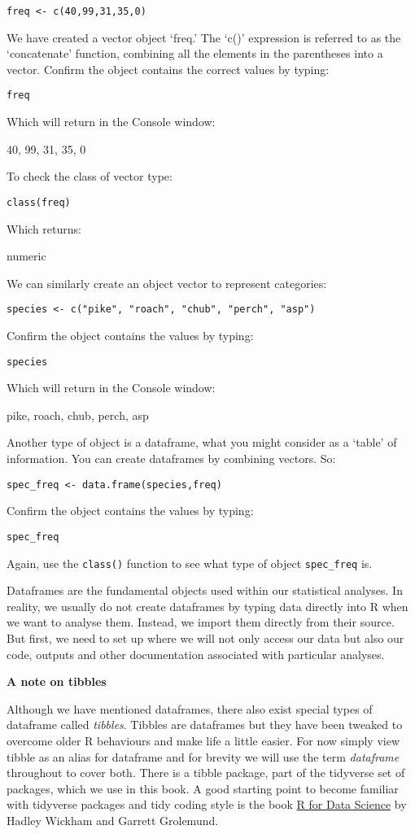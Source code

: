 \documentclass[
]{book}
\begin{document}
\texttt{freq\ \textless{}-\ c(40,99,31,35,0)}

We have created a vector object `freq.' The `c()' expression is referred
to as the `concatenate' function, combining all the elements in the
parentheses into a vector. Confirm the object contains the correct
values by typing:

\texttt{freq}

Which will return in the Console window:

40, 99, 31, 35, 0

To check the class of vector type:

\texttt{class(freq)}

Which returns:

numeric

We can similarly create an object vector to represent categories:

\texttt{species\ \textless{}-\ c("pike",\ "roach",\ "chub",\ "perch",\ "asp")}

Confirm the object contains the values by typing:

\texttt{species}

Which will return in the Console window:

pike, roach, chub, perch, asp

Another type of object is a dataframe, what you might consider as a
`table' of information. You can create dataframes by combining vectors.
So:

\texttt{spec\_freq\ \textless{}-\ data.frame(species,freq)}

Confirm the object contains the values by typing:

\texttt{spec\_freq}

Again, use the \texttt{class()} function to see what type of object
\texttt{spec\_freq} is.

Dataframes are the fundamental objects used within our statistical
analyses. In reality, we usually do not create dataframes by typing data
directly into R when we want to analyse them. Instead, we import them
directly from their source. But first, we need to set up where we will
not only access our data but also our code, outputs and other
documentation associated with particular analyses.

\textbf{A note on tibbles}

Although we have mentioned dataframes, there also exist special types of
dataframe called \emph{tibbles}. Tibbles are dataframes but they have
been tweaked to overcome older R behaviours and make life a little
easier. For now simply view tibble as an alias for dataframe and for
brevity we will use the term \emph{dataframe} throughout to cover both.
There is a tibble package, part of the tidyverse set of packages, which
we use in this book. A good starting point to become familiar with
tidyverse packages and tidy coding style is the book
\href{https://r4ds.had.co.nz/}{R for Data Science} by Hadley Wickham and
Garrett Grolemund.
\end{document}
